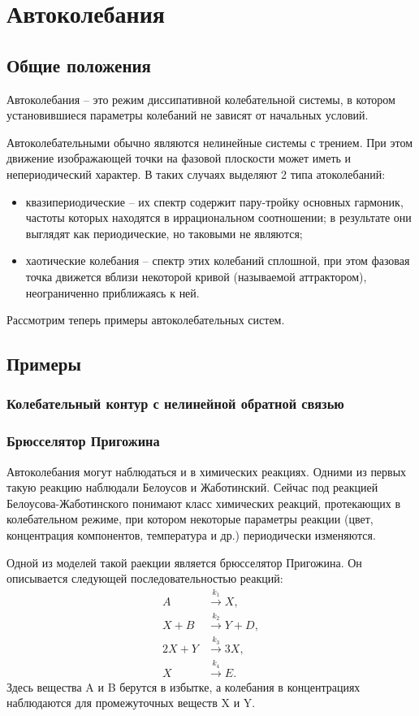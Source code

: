 \section{Автоколебания}
\subsection{Общие положения}

Автоколебания -- это режим диссипативной колебательной системы, в котором
установившиеся параметры колебаний не зависят от начальных условий.

Автоколебательными обычно являются нелинейные системы с трением. При этом
движение изображающей точки на фазовой плоскости может иметь и непериодический
характер. В таких случаях выделяют 2 типа атоколебаний:
\begin{itemize}
    \item квазипериодические -- их спектр содержит пару-тройку основных
        гармоник, частоты которых находятся в иррациональном соотношении; в
        результате они выглядят как периодические, но таковыми не являются;
    \item хаотические колебания -- спектр этих колебаний сплошной, при этом
        фазовая точка движется вблизи некоторой кривой (называемой аттрактором),
        неограниченно приближаясь к ней.
\end{itemize}

Рассмотрим теперь примеры автоколебательных систем.
\subsection{Примеры}

\subsubsection{Колебательный контур с нелинейной обратной связью}
\subsubsection{Брюсселятор Пригожина}
Автоколебания могут наблюдаться и в химических реакциях. Одними из первых такую
реакцию наблюдали Белоусов и Жаботинский. Сейчас под реакцией
Белоусова-Жаботинского понимают класс химических реакций, протекающих в
колебательном режиме, при котором некоторые параметры реакции (цвет,
концентрация компонентов, температура и др.) периодически изменяются.

Одной из моделей такой раекции является брюсселятор Пригожина. Он описывается
следующей последовательностью реакций:
\begin{align*}
    A      & \xrightarrow{k_1} X,\\
    X + B  & \xrightarrow{k_2} Y + D,\\
    2X + Y & \xrightarrow{k_3} 3X,\\
    X      & \xrightarrow{k_4} E.
\end{align*}
Здесь вещества A и B берутся в избытке, а колебания в концентрациях
наблюдаются для промежуточных веществ X и Y.

